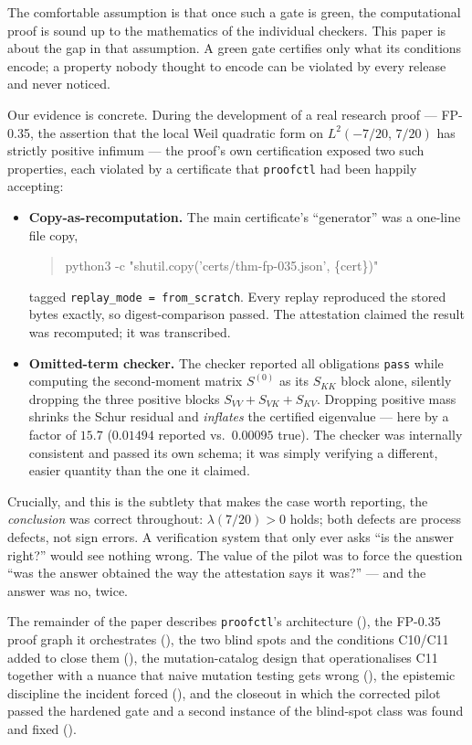 \documentclass[11pt,a4paper]{amsart}
\theoremstyle{plain}
\theoremstyle{definition}
\newcommand{\proofctl}{\texttt{proofctl}}
\newcommand{\CtenA}{\textsf{C10}}
\newcommand{\CelevenA}{\textsf{C11}}
\begin{document}
The comfortable assumption is that once such a gate is green, the computational
proof is sound up to the mathematics of the individual checkers. This paper is
about the gap in that assumption. A green gate certifies only what its conditions
encode; a property nobody thought to encode can be violated by every release and
never noticed.

Our evidence is concrete. During the development of a real research proof ---
FP-0.35, the assertion that the local Weil quadratic form on
$L^2(-7/20,\,7/20)$ has strictly positive infimum \cite{WFP2026} --- the proof's
own certification exposed two such properties, each violated by a certificate
that \proofctl{} had been happily accepting:

\begin{itemize}
\item \textbf{Copy-as-recomputation.} The main certificate's ``generator'' was a
  one-line file copy,
  \begin{quote}\small\ttfamily
  python3 -c "shutil.copy('certs/thm-fp-035.json', \{cert\})"
  \end{quote}
  tagged \texttt{replay\_mode = from\_scratch}. Every replay reproduced the
  stored bytes exactly, so digest-comparison passed. The attestation claimed the
  result was recomputed; it was transcribed.
\item \textbf{Omitted-term checker.} The checker reported all obligations
  \texttt{pass} while computing the second-moment matrix $S^{(0)}$ as its
  $S_{KK}$ block alone, silently dropping the three positive blocks
  $S_{VV}+S_{VK}+S_{KV}$. Dropping positive mass shrinks the Schur residual and
  \emph{inflates} the certified eigenvalue --- here by a factor of $15.7$
  ($0.01494$ reported vs.\ $0.00095$ true). The checker was internally
  consistent and passed its own schema; it was simply verifying a different,
  easier quantity than the one it claimed.
\end{itemize}

Crucially, and this is the subtlety that makes the case worth reporting, the
\emph{conclusion} was correct throughout: $\lambda(7/20)>0$ holds; both defects
are process defects, not sign errors. A verification system that only ever asks
``is the answer right?'' would see nothing wrong. The value of the pilot was to
force the question ``was the answer obtained the way the attestation says it
was?'' --- and the answer was no, twice.

The remainder of the paper describes \proofctl{}'s architecture
(), the FP-0.35 proof graph it orchestrates (),
the two blind spots and the conditions \CtenA{}/\CelevenA{} added to close them
(), the mutation-catalog design that operationalises
\CelevenA{} together with a nuance that naive mutation testing gets wrong
(), the epistemic discipline the incident forced
(), and the closeout in which the corrected pilot passed
the hardened gate and a second instance of the blind-spot class was found and
fixed ().
\end{document}
